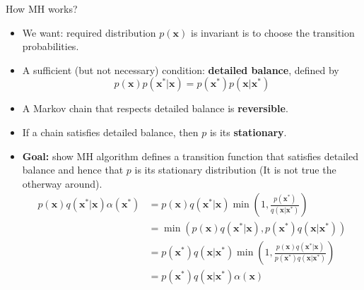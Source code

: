 \documentclass[10pt,mathserif]{beamer}
\begin{document}
\begin{frame}{How MH works?}
\begin{itemize}
    \item We want: required distribution $p(\bm{x})$ is invariant is to choose the transition probabilities.
    \item A sufficient (but not necessary) condition: \textbf{detailed balance}, defined by
    \begin{equation*} 
        p(\bm{x})p(\bm{x}^*|\bm{x}) = p(\bm{x}^*) p(\bm{x}|\bm{x}^*) 
    \end{equation*} 
    \item A Markov chain that respects detailed balance is \textbf{reversible}.
    \item If a chain satisfies detailed balance, then $p$ is its \textbf{stationary}.
    \item \textbf{Goal:} show MH algorithm defines a transition function that satisfies detailed balance and hence that $p$ is its stationary distribution (It is not true the otherway around).
    \begin{equation*}  %
        \begin{split} 
        p(\bm{x})q(\bm{x}^*|\bm{x})\alpha(\bm{x}^*) & = p(\bm{x})q(\bm{x}^*|\bm{x})\min(1,\frac{p(\bm{x}^*)}{q(\bm{x}|\bm{x}^*)}) \\
        & = \min(p(\bm{x})q(\bm{x}^*|\bm{x}),p(\bm{x}^*)q(\bm{x}|\bm{x}^*))\\
        & = p(\bm{x}^*)q(\bm{x}|\bm{x}^*)\min(1,\frac{p(\bm{x})q(\bm{x}^*|\bm{x})}{p(\bm{x}^*)q(\bm{x}|\bm{x}^*)}) \\
        & =p(\bm{x}^*)q(\bm{x}|\bm{x}^*)\alpha(\bm{x})
        \end{split} 
        \end{equation*} 
\end{itemize}
\end{frame}
        
\end{document}
